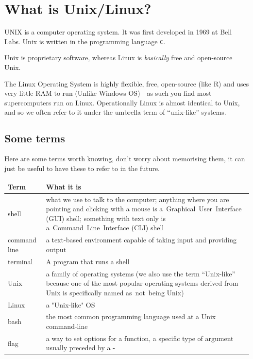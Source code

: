 \documentclass[
]{book}
\begin{document}
\hypertarget{what-is-unixlinux}{%
\section{What is Unix/Linux?}\label{what-is-unixlinux}}

UNIX is a computer operating system. It was first developed in 1969 at Bell Labs. Unix is written in the programming language \texttt{C}.

Unix is proprietary software, whereas Linux is \emph{basically} free and open-source Unix.

The Linux Operating System is highly flexible, free, open-source (like R) and uses very little RAM to run (Unlike Windows OS) - as such you find most supercomputers run on Linux. Operationally Linux is almost identical to Unix, and so we often refer to it under the umbrella term of ``unix-like'' systems.

\hypertarget{some-terms}{%
\subsection{Some terms}\label{some-terms}}

Here are some terms worth knowing, don't worry about memorising them, it can just be useful to have these to refer to in the future.

\begin{longtable}{ll}
\toprule
\textbf{Term} & \textbf{What it is}\\
\midrule
shell & what we use to talk to the computer; anything where you are pointing and clicking with a mouse is a Graphical User Interface (GUI) shell; something with text only is a Command Line Interface (CLI) shell\\
command line & a text-based environment capable of taking input and providing output\\
terminal & A program that runs a shell\\
Unix & a family of operating systems (we also use the term “Unix-like” because one of the most popular operating systems derived from Unix is specifically named as not being Unix)\\
Linux & a "Unix-like" OS\\
\addlinespace
bash & the most common programming language used at a Unix command-line\\
flag & a way to set options for a function, a specific type of argument usually preceded by a -\\
\bottomrule
\end{longtable}
\end{document}
